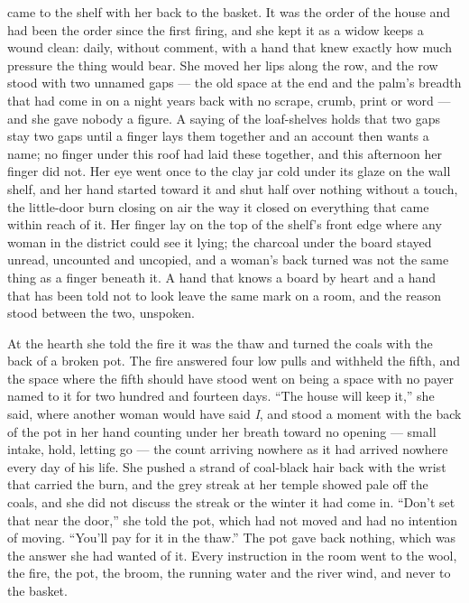  came to the shelf with her back to the basket. It was the order of the house and had been the order since the first firing, and she kept it as a widow keeps a wound clean: daily, without comment, with a hand that knew exactly how much pressure the thing would bear. She moved her lips along the row, and the row stood with two unnamed gaps --- the old space at the end and the palm's breadth that had come in on a night years back with no scrape, crumb, print or word --- and she gave nobody a figure. A saying of the loaf-shelves holds that two gaps stay two gaps until a finger lays them together and an account then wants a name; no finger under this roof had laid these together, and this afternoon her finger did not. Her eye went once to the clay jar cold under its glaze on the wall shelf, and her hand started toward it and shut half over nothing without a touch, the little-door burn closing on air the way it closed on everything that came within reach of it. Her finger lay on the top of the shelf's front edge where any woman in the district could see it lying; the charcoal under the board stayed unread, uncounted and uncopied, and a woman's back turned was not the same thing as a finger beneath it. A hand that knows a board by heart and a hand that has been told not to look leave the same mark on a room, and the reason stood between the two, unspoken.

At the hearth she told the fire it was the thaw and turned the coals with the back of a broken pot. The fire answered four low pulls and withheld the fifth, and the space where the fifth should have stood went on being a space with no payer named to it for two hundred and fourteen days. “The house will keep it,” she said, where another woman would have said \emph{I}, and stood a moment with the back of the pot in her hand counting under her breath toward no opening --- small intake, hold, letting go --- the count arriving nowhere as it had arrived nowhere every day of his life. She pushed a strand of coal-black hair back with the wrist that carried the burn, and the grey streak at her temple showed pale off the coals, and she did not discuss the streak or the winter it had come in. “Don't set that near the door,” she told the pot, which had not moved and had no intention of moving. “You'll pay for it in the thaw.” The pot gave back nothing, which was the answer she had wanted of it. Every instruction in the room went to the wool, the fire, the pot, the broom, the running water and the river wind, and never to the basket.

